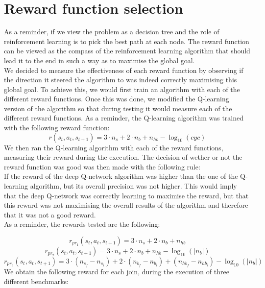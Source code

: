 \section{Reward function selection}
As a reminder, if we view the problem as a decision tree and the role of reinforcement learning is to pick the best path at each node. The reward function can be viewed as the compass of the reinforcement learning algorithm that should lead it to the end in such a way as to maximise the global goal.\\
We decided to measure the effectiveness of each reward function by observing if the direction it steered the algorithm to was indeed correctly maximising this global goal. To achieve this, we would first train an algorithm with each of the different reward functions. Once this was done, we modified the Q-learning version of the algorithm so that during testing it would measure each of the different reward functions. As a reminder, the Q-learning algorithm was trained with the following reward function:
\begin{equation}
	r(s_t,a_t,s_{t+1}) = 3  \cdot n_s + 2 \cdot n_b + n_{hb} - \log_{10}(cyc)
\end{equation}
We then ran the Q-learning algorithm with each of the reward functions, measuring their reward during the execution. The decision of wether or not the reward function was good was then made with the following rule:\\
If the reward of the deep Q-network algorithm was higher than the one of the Q-learning algorithm, but its overall precision was not higher. This would imply that the deep Q-network was correctly learning to maximise the reward, but that this reward was not maximising the overall results of the algorithm and therefore that it was not a good reward.\\
As a reminder, the rewards tested are the following:
 
\begin{equation}
		r_{pr_1}(s_t,a_t,s_{t+1}) = 3  \cdot n_s + 2 \cdot n_b + n_{hb}
\end{equation}
\begin{equation}
		r_{pr_2}(s_t,a_t,s_{t+1}) = 3  \cdot n_s + 2 \cdot n_b + n_{hb} - \log_{10}(|n_b|)
\end{equation}
\begin{equation}
		r_{pr_3}(s_t,a_t,s_{t+1}) = 3  \cdot (n_{s_f} - n_{s_i}) + 2 \cdot (n_{b_f} - n_{b_i}) + (n_{hb_f} - n_{hb_i}) - \log_{10}(|n_b|)
\end{equation}
We obtain the following reward for each join, during the execution of three different benchmarks: 

